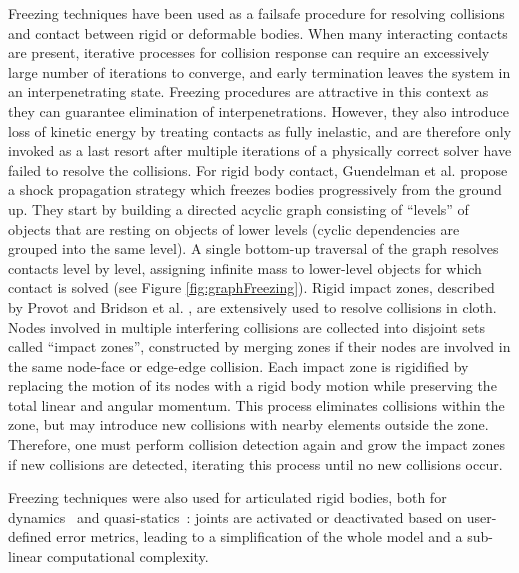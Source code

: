 Freezing techniques have been used as a failsafe procedure for resolving collisions and contact between rigid or deformable bodies.
When many interacting contacts are present, iterative processes for collision response can require an excessively large number of iterations to converge, and early termination leaves the system in an interpenetrating state.
Freezing procedures are attractive in this context as they can guarantee elimination of interpenetrations.
However, they also introduce loss of kinetic energy by treating contacts as fully inelastic, and are therefore only invoked as a last resort after multiple iterations of a physically correct solver have failed to resolve the collisions.
For rigid body contact, Guendelman et al. \cite{Guendelman2003} propose a shock propagation strategy which freezes bodies progressively from the ground up.
They start by building a directed acyclic graph consisting of ``levels'' of objects that are resting on objects of lower levels (cyclic dependencies are grouped into the same level).
A single bottom-up traversal of the graph resolves contacts level by level, assigning infinite mass to lower-level objects for which contact is solved (see Figure \ref{fig:graphFreezing}).
Rigid impact zones, described by Provot \cite{Provot1997} and Bridson et al. \cite{Bridson2002}, are extensively used to resolve collisions in cloth.
Nodes involved in multiple interfering collisions are collected into disjoint sets called ``impact zones'', constructed by merging zones if their nodes are involved in the same node-face or edge-edge collision.
Each impact zone is rigidified by replacing the motion of its nodes with a rigid body motion while preserving the total linear and angular momentum.
This process eliminates collisions within the zone, but may introduce new collisions with nearby elements outside the zone.
Therefore, one must perform collision detection again and grow the impact zones if new collisions are detected, iterating this process until no new collisions occur.

Freezing techniques were also used for articulated rigid bodies, both for dynamics~\cite{Redon2005} and quasi-statics~\cite{Redon2006}: joints are activated or deactivated based on user-defined error metrics, leading to a simplification of the whole model and a sub-linear computational complexity.

